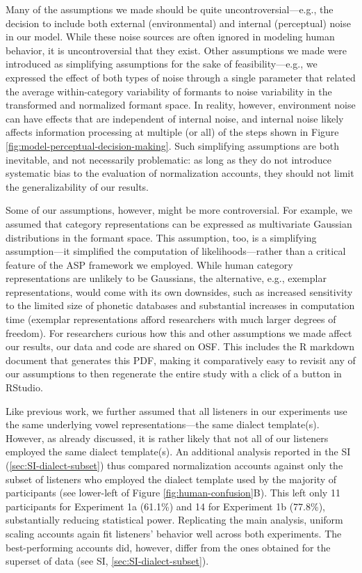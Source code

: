 \documentclass[preprint]{JASA}
\begin{document}
Many of the assumptions we made should be quite uncontroversial---e.g., the decision to include both external (environmental) and internal (perceptual) noise in our model. While these noise sources are often ignored in modeling human behavior, it is uncontroversial that they exist. Other assumptions we made were introduced as simplifying assumptions for the sake of feasibility---e.g., we expressed the effect of both types of noise through a single parameter that related the average within-category variability of formants to noise variability in the transformed and normalized formant space. In reality, however, environment noise can have effects that are independent of internal noise, and internal noise likely affects information processing at multiple (or all) of the steps shown in Figure \ref{fig:model-perceptual-decision-making}. Such simplifying assumptions are both inevitable, and not necessarily problematic: as long as they do not introduce systematic bias to the evaluation of normalization accounts, they should not limit the generalizability of our results.

Some of our assumptions, however, might be more controversial. For example, we assumed that category representations can be expressed as multivariate Gaussian distributions in the formant space. This assumption, too, is a simplifying assumption---it simplified the computation of likelihoods---rather than a critical feature of the ASP framework we employed. While human category representations are unlikely to be Gaussians, the alternative, e.g., exemplar representations, would come with its own downsides, such as increased sensitivity to the limited size of phonetic databases and substantial increases in computation time (exemplar representations afford researchers with much larger degrees of freedom). For researchers curious how this and other assumptions we made affect our results, our data and code are shared on OSF. This includes the R markdown document that generates this PDF, making it comparatively easy to revisit any of our assumptions to then regenerate the entire study with a click of a button in RStudio.

Like previous work, we further assumed that all listeners in our experiments use the same underlying vowel representations---the same dialect template(s). However, as already discussed, it is rather likely that not all of our listeners employed the same dialect template(s). An additional analysis reported in the SI (\ref{sec:SI-dialect-subset}) thus compared normalization accounts against only the subset of listeners who employed the dialect template used by the majority of participants (see lower-left of Figure \ref{fig:human-confusion}B). This left only 11 participants for Experiment 1a (61.1\%) and 14 for Experiment 1b (77.8\%), substantially reducing statistical power. Replicating the main analysis, uniform scaling accounts again fit listeners' behavior well across both experiments. The best-performing accounts did, however, differ from the ones obtained for the superset of data (see SI, \ref{sec:SI-dialect-subset}).
\end{document}
